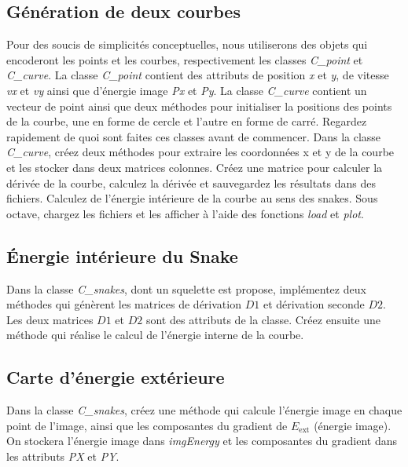 \documentclass[10pt,a4paper]{article}
\begin{document}
\subsection{G\'{e}n\'{e}ration de deux courbes}
Pour des soucis de simplicit\'{e}s conceptuelles, nous utiliserons des objets qui encoderont les points et les courbes, respectivement les classes \textit{C\_point} et \textit{C\_curve}. La classe \textit{C\_point} contient des attributs de position \textit{x} et \textit{y}, de vitesse \textit{vx} et \textit{vy} ainsi que d'\'{e}nergie image \textit{Px} et \textit{Py}. La classe \textit{C\_curve} contient un vecteur de point ainsi que deux m\'{e}thodes pour initialiser la positions des points de la courbe, une en forme de cercle et l'autre en forme de carr\'{e}. Regardez rapidement de quoi sont faites ces classes avant de commencer.
Dans la classe \textit{C\_curve}, cr\'{e}ez deux m\'{e}thodes pour extraire les coordonn\'{e}es x et y de la courbe et les stocker dans deux matrices colonnes. Cr\'{e}ez une matrice pour calculer la d\'{e}riv\'{e}e de la courbe, calculez la d\'{e}riv\'{e}e et sauvegardez les r\'{e}sultats dans des fichiers. Calculez de l'\'{e}nergie int\'{e}rieure de la courbe au sens des snakes. Sous octave, chargez les fichiers et les afficher \`{a} l'aide des fonctions \textit{load} et \textit{plot}.

\subsection{\'{E}nergie int\'{e}rieure du Snake}
Dans la classe \textit{C\_snakes}, dont un squelette est propose, impl\'{e}mentez deux m\'{e}thodes qui g\'{e}n\`{e}rent les matrices de d\'{e}rivation $D1$ et d\'{e}rivation seconde $D2$. Les deux matrices $D1$ et $D2$ sont des attributs de la classe. Cr\'{e}ez ensuite une m\'{e}thode qui r\'{e}alise le calcul de l'\'{e}nergie interne de la courbe.

\subsection{Carte d'\'{e}nergie ext\'{e}rieure}
Dans la classe \textit{C\_snakes}, cr\'{e}ez une m\'{e}thode qui calcule l'\'{e}nergie image en chaque point de l'image, ainsi que les composantes du gradient de $E_{\text{ext}}$ (\'{e}nergie image). On stockera l'\'{e}nergie image dans \textit{imgEnergy} et les composantes du gradient dans les attributs \textit{PX} et \textit{PY}.

\end{document}
